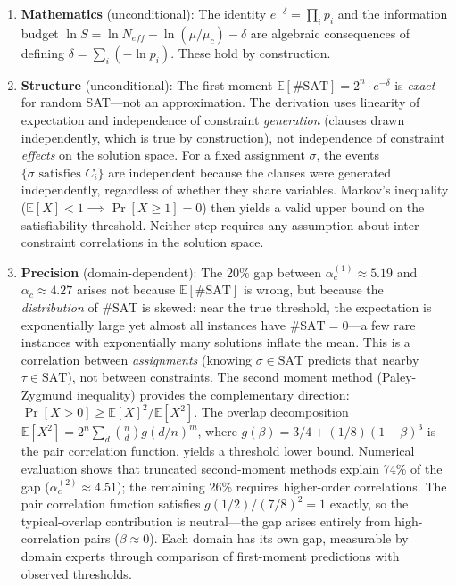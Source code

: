 \documentclass[11pt,a4paper]{article}
\begin{document}
\begin{enumerate}
    \item \textbf{Mathematics} (unconditional): The identity $e^{-\delta} = \prod_i p_i$ and the information budget $\ln S = \ln N_{eff} + \ln(\mu/\mu_c) - \delta$ are algebraic consequences of defining $\delta = \sum_i (-\ln p_i)$. These hold by construction.

    \item \textbf{Structure} (unconditional): The first moment $\mathbb{E}[\#\text{SAT}] = 2^n \cdot e^{-\delta}$ is \emph{exact} for random SAT---not an approximation. The derivation uses linearity of expectation and independence of constraint \emph{generation} (clauses drawn independently, which is true by construction), not independence of constraint \emph{effects} on the solution space. For a fixed assignment $\sigma$, the events $\{\sigma \text{ satisfies } C_i\}$ are independent because the clauses were generated independently, regardless of whether they share variables. Markov's inequality ($\mathbb{E}[X] < 1 \implies \Pr[X \geq 1] = 0$) then yields a valid upper bound on the satisfiability threshold. Neither step requires any assumption about inter-constraint correlations in the solution space.

    \item \textbf{Precision} (domain-dependent): The 20\% gap between $\alpha_c^{(1)} \approx 5.19$ and $\alpha_c \approx 4.27$ arises not because $\mathbb{E}[\#\text{SAT}]$ is wrong, but because the \emph{distribution} of $\#\text{SAT}$ is skewed: near the true threshold, the expectation is exponentially large yet almost all instances have $\#\text{SAT} = 0$---a few rare instances with exponentially many solutions inflate the mean. This is a correlation between \emph{assignments} (knowing $\sigma \in \text{SAT}$ predicts that nearby $\tau \in \text{SAT}$), not between constraints. The second moment method (Paley-Zygmund inequality) provides the complementary direction: $\Pr[X > 0] \geq \mathbb{E}[X]^2 / \mathbb{E}[X^2]$. The overlap decomposition $\mathbb{E}[X^2] = 2^n \sum_d \binom{n}{d} g(d/n)^m$, where $g(\beta) = 3/4 + (1/8)(1-\beta)^3$ is the pair correlation function, yields a threshold lower bound. Numerical evaluation shows that truncated second-moment methods explain 74\% of the gap ($\alpha_c^{(2)} \approx 4.51$); the remaining 26\% requires higher-order correlations. The pair correlation function satisfies $g(1/2)/(7/8)^2 = 1$ exactly, so the typical-overlap contribution is neutral---the gap arises entirely from high-correlation pairs ($\beta \approx 0$). Each domain has its own gap, measurable by domain experts through comparison of first-moment predictions with observed thresholds.
\end{enumerate}
\end{document}
